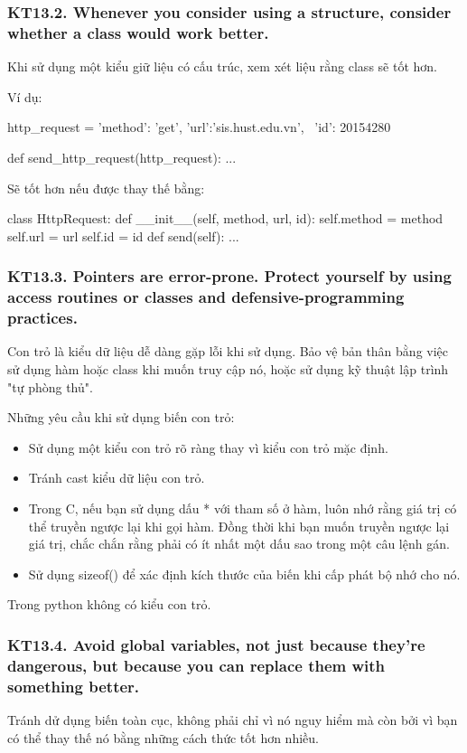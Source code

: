 \documentclass[12pt]{report}
\begin{document}
\subsubsection{KT13.2. Whenever you consider using a structure, consider whether a class would work better.}
Khi sử dụng một kiểu giữ liệu có cấu trúc, xem xét liệu rằng class sẽ tốt hơn.

Ví dụ:
\begin{python}
http_request = {'method': 'get', 'url':'sis.hust.edu.vn', \
						'id': 20154280}

def send_http_request(http_request):
	...
\end{python}
Sẽ tốt hơn nếu được thay thế bằng:
\begin{python}
class HttpRequest:
	def __init__(self, method, url, id):
		self.method = method
		self.url = url
		self.id = id
	def send(self):
		...
\end{python}

 
\subsubsection{KT13.3. Pointers are error-prone. Protect yourself by using access routines or classes and defensive-programming practices.}
Con trỏ là kiểu dữ liệu dễ dàng gặp lỗi khi sử dụng. Bảo vệ bản thân bằng việc sử dụng hàm hoặc class khi muốn truy cập nó, hoặc sử dụng kỹ thuật lập trình "tự phòng thủ".
\vspace*{5mm}

\noindent Những yêu cầu khi sử dụng biến con trỏ:
\begin{itemize}
	\item Sử dụng một kiểu con trỏ rõ ràng thay vì kiểu con trỏ mặc định. 
	\item Tránh cast kiểu dữ liệu con trỏ.
	\item Trong C, nếu bạn sử dụng dấu * với tham số ở hàm, luôn nhớ rằng giá trị có thể truyền ngược lại khi gọi hàm. Đồng thời khi bạn muốn truyền ngược lại giá trị, chắc chắn rằng phải có ít nhất một dấu sao trong một câu lệnh gán. 
	\item Sử dụng sizeof() để xác định kích thước của biến khi cấp phát bộ nhớ cho nó. 
\end{itemize}
Trong python không có kiểu con trỏ. 

\subsubsection{KT13.4. Avoid global variables, not just because they're dangerous, but because you can replace them with something better.}
Tránh dử dụng biến toàn cục, không phải chỉ vì nó nguy hiểm mà còn bởi vì bạn có thể thay thế nó bằng những cách thức tốt hơn nhiều. 
\vspace*{5mm}
\end{document}

